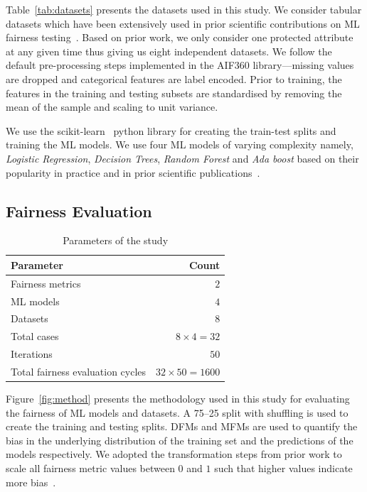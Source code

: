 \documentclass[conference,review,anonymous]{IEEEtran}
\begin{document}
Table \ref{tab:datasets} presents the datasets used in this study. We
consider tabular datasets which have been extensively used in prior
scientific contributions on ML fairness
testing \cite{zhang2021ignorance,biswas2020machine,biswas2021fair,chen2022fairness}. Based
on prior work, we only consider one protected attribute at any given
time thus giving us eight independent datasets. We follow the default
pre-processing steps implemented in the AIF360 library---missing
values are dropped and categorical features are label encoded. Prior
to training, the features in the training and testing subsets are
standardised by removing the mean of the sample and scaling to unit
variance.

We use the scikit-learn \cite{pedregosa2011scikit} python library for
creating the train-test splits and training the ML models. We use four
ML models of varying complexity namely, \emph{Logistic Regression},
\emph{Decision Trees}, \emph{Random Forest} and \emph{Ada boost} based
on their popularity in practice and in prior scientific
publications \cite{zhang2021ignorance,biswas2021fair,biswas2020machine}.

\subsection{Fairness Evaluation}\label{sec:method-fair-eval}

\begin{table}
  \centering
  \caption{Parameters of the study}
  \begin{tabular}{l r}
    \hline
    \textbf{Parameter} & \textbf{Count}\\
    \hline
    Fairness metrics & $2$\\
    ML models & $4$\\
    Datasets & $8$\\
    Total cases & $8\times4=32$\\
    Iterations & $50$\\
    Total fairness evaluation cycles & $32\times50=1600$\\
    \hline
  \end{tabular}
  \label{tab:parameters}
\end{table}

Figure \ref{fig:method} presents the methodology used in this study
for evaluating the fairness of ML models and datasets. A 75--25 split
with shuffling is used to create the training and testing splits. DFMs
and MFMs are used to quantify the bias in the underlying distribution
of the training set and the predictions of the models respectively. We
adopted the transformation steps from prior work to scale all fairness
metric values between $0$ and $1$ such that higher values indicate
more bias \cite{zhang2021ignorance,hort2021fairea}.
\end{document}
